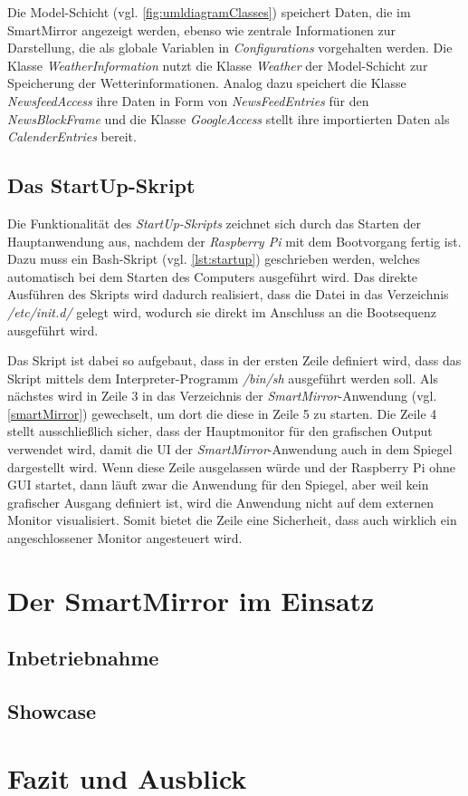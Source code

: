  Die Model-Schicht (vgl. \autoref{fig:umldiagramClasses}) speichert Daten, die im SmartMirror angezeigt werden, ebenso wie zentrale Informationen zur Darstellung, die als globale Variablen in \textit{Configurations} vorgehalten werden. Die Klasse \textit{WeatherInformation} nutzt die Klasse \textit{Weather} der Model-Schicht zur Speicherung der Wetterinformationen. 
 Analog dazu speichert die Klasse \textit{NewsfeedAccess} ihre Daten in Form von \textit{NewsFeedEntries} für den \textit{NewsBlockFrame} und die Klasse \textit{GoogleAccess} stellt ihre importierten Daten  als \textit{CalenderEntries} bereit.
 

\subsection{Das StartUp-Skript}

Die Funktionalität des \textit{StartUp-Skripts} zeichnet sich durch das Starten der Hauptanwendung aus, nachdem der \textit{Raspberry Pi} mit dem Bootvorgang fertig ist. Dazu muss ein Bash-Skript (vgl. \autoref{lst:startup}) geschrieben werden, welches automatisch bei dem Starten des Computers ausgeführt wird. 
Das direkte Ausführen des Skripts wird dadurch realisiert, dass die Datei in das Verzeichnis \textit{/etc/init.d/} gelegt wird, wodurch sie direkt im Anschluss an die Bootsequenz ausgeführt wird. 

\begin{minipage}{\textwidth}
	
\end{minipage} 

Das Skript ist dabei so aufgebaut, dass in der ersten Zeile definiert wird, dass das Skript mittels dem Interpreter-Programm \textit{/bin/sh} ausgeführt werden soll. Als nächstes wird in Zeile 3 in das Verzeichnis der \textit{SmartMirror}-Anwendung (vgl. \autoref{smartMirror}) gewechselt, um dort die diese in Zeile 5 zu starten. Die Zeile 4 stellt ausschließlich sicher, dass der Hauptmonitor für den grafischen Output verwendet wird, damit die UI der \textit{SmartMirror}-Anwendung auch in dem Spiegel dargestellt wird. Wenn diese Zeile ausgelassen würde und der Raspberry Pi ohne GUI startet, dann läuft zwar die Anwendung für den Spiegel, aber weil kein grafischer Ausgang definiert ist, wird die Anwendung nicht auf dem externen Monitor visualisiert. Somit bietet die Zeile eine Sicherheit, dass auch wirklich ein angeschlossener Monitor angesteuert wird.

\section{Der SmartMirror im Einsatz}
\subsection{Inbetriebnahme}
\subsection{Showcase}

\section{Fazit und Ausblick}

